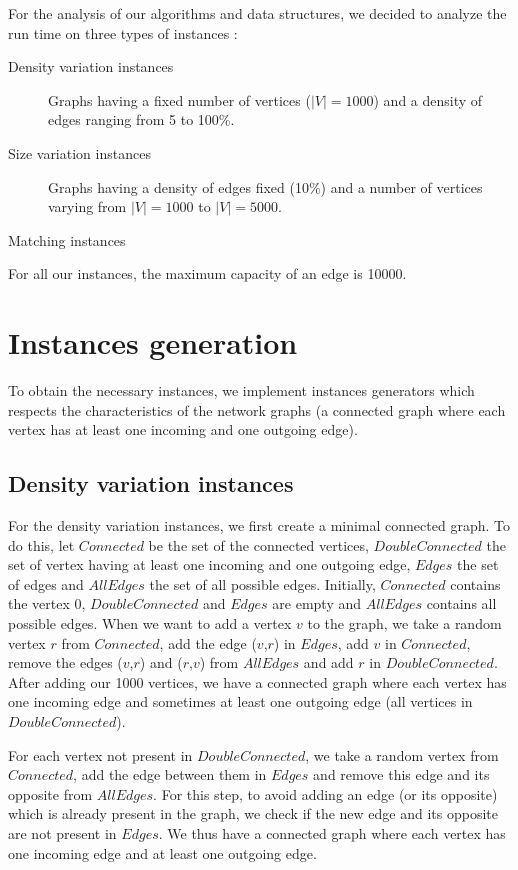 
For the analysis of our algorithms and data structures, we decided to analyze the run time on three types of instances :
\begin{description}
\item[Density variation instances]{Graphs having  a fixed number of vertices ($|V|=1000$) and a density of edges ranging from 5 to 100\%.}
\item[Size variation instances]{Graphs having a density of edges fixed (10\%) and a number of vertices varying from $|V|=1000$ to $|V|=5000$.}
\item[Matching instances]{}
\end{description} 

For all our instances, the maximum capacity of an edge is 10000.


\section{Instances generation}
To obtain the necessary instances, we implement instances generators which respects the characteristics of the network graphs (a connected graph where each vertex has at least one incoming and one outgoing edge). \\

\subsection{Density variation instances}
For the density variation instances, we first create a minimal connected graph. To do this, let $Connected$ be the set of the connected vertices, $DoubleConnected$ the set of vertex having at least one incoming and one outgoing edge, $Edges$ the set of edges and $AllEdges$ the set of all possible edges. Initially, $Connected$ contains the vertex 0, $DoubleConnected$ and $Edges$ are empty and $AllEdges$ contains all possible edges. When we want to add a vertex $v$ to the graph, we take a random vertex $r$ from $Connected$, add the edge ($v$,$r$) in $Edges$, add $v$ in $Connected$, remove the edges ($v$,$r$) and ($r$,$v$) from $AllEdges$ and add $r$ in $DoubleConnected$. After adding our 1000 vertices, we have a connected graph where each vertex has one incoming edge and sometimes at least one outgoing edge (all vertices in $DoubleConnected$).

For each vertex not present in $DoubleConnected$, we take a random vertex from $Connected$, add the edge between them in $Edges$ and remove this edge and its opposite from $AllEdges$. For this step, to avoid adding an edge (or its opposite) which is already present in the graph, we check if the new edge and its opposite are not present in $Edges$. We thus have a connected graph where each vertex has one incoming edge and at least one outgoing edge.

